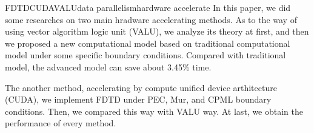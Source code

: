 
\begin{Eabstract}{FDTD}{CUDA}{VALU}{data parallelism}{hardware accelerate}
In this paper, we did some researches on two main hradware accelerating methods. As to the way of using vector algorithm logic unit (VALU), we analyze its theory at first, and then we proposed a new computational model based on traditional computational model under some specific boundary conditions. Compared with traditional model, the advanced model can save about 3.45\% time.

The another method, accelerating by compute unified device arthitecture (CUDA), we implement FDTD under PEC, Mur, and CPML boundary conditions. Then, we compared this way with VALU way. At last, we obtain the performance of every method.
\end{Eabstract}
